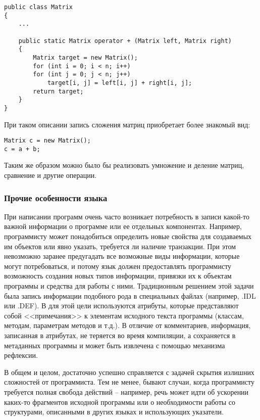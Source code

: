 \begin{lstlisting}[caption={Пример перегрузки операторов}]
public class Matrix
{
    ...

    public static Matrix operator + (Matrix left, Matrix right)
    {
        Matrix target = new Matrix();
        for (int i = 0; i < n; i++)
        for (int j = 0; j < n; j++)
            target[i, j] = left[i, j] + right[i, j];
        return target;
    }
}
\end{lstlisting}

При таком описании запись сложения матриц приобретает более знакомый вид:

\begin{lstlisting}[caption={Пример использования перегруженного оператора}]
Matrix c = new Matrix();
c = a + b;
\end{lstlisting}

Таким же образом можно было бы реализовать умножение и деление матриц, сравнение и
другие операции.


\subsubsection{Прочие особенности языка \CSharp}

При написании программ очень часто возникает потребность в записи какой-то важной информации о программе или ее отдельных компонентах. Например, программисту может понадобиться определить новые свойства для создаваемых им объектов или явно указать, требуется ли наличие транзакции. При этом невозможно заранее предугадать все возможные виды информации, которые могут потребоваться, и потому язык должен предоставлять программисту возможность создания новых типов информации, привязки их к объектам программы и средства для работы с ними. Традиционным решением этой задачи была запись информации подобного рода в специальных файлах (например, .IDL или .DEF). В \CSharp для этой цели используются атрибуты, которые представляют собой <<примечания>> к элементам исходного текста программы (классам, методам, параметрам методов и т.д.). В отличие от комментариев, информация, записанная в атрибутах, не теряется во время компиляции, а сохраняется в метаданных программы и может быть извлечена с помощью механизма рефлексии.

В общем и целом, \CSharp достаточно успешно справляется с задачей скрытия излишних сложностей от программиста. Тем не менее, бывают случаи, когда программисту требуется полная свобода действий -- например, речь может идти об ускорении каких-то фрагментов исходной программы или о необходимости работы со структурами, описанными в других языках и использующих указатели.

